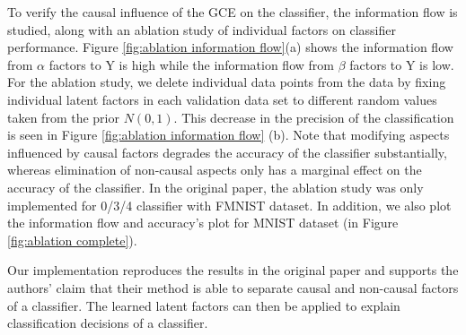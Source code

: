 To verify the causal influence of the GCE on the classifier, the information flow is studied, along with an ablation study of individual factors on classifier performance. Figure \ref{fig:ablation information flow}(a) shows the information flow from $\alpha$ factors to Y is high while the information flow from $\beta$ factors to Y is low. For the ablation study, we delete individual data points from the data by fixing individual latent factors in each validation data set to different random values taken from the prior $N(0,1)$.     This decrease in the precision of the classification is seen in Figure \ref{fig:ablation information flow} (b). Note that modifying aspects influenced by causal factors degrades the accuracy of the classifier substantially, whereas elimination of non-causal aspects only has a marginal effect on the accuracy of the classifier. In the original paper, the ablation study was only implemented for 0/3/4 classifier with FMNIST dataset. In addition, we also plot the information flow and accuracy's plot for MNIST dataset (in Figure \ref{fig:ablation complete}).

Our implementation reproduces the results in the original paper and supports the authors' claim that their method is able to separate causal and non-causal factors of a classifier. The learned latent factors can then be applied to explain classification decisions of a classifier.

